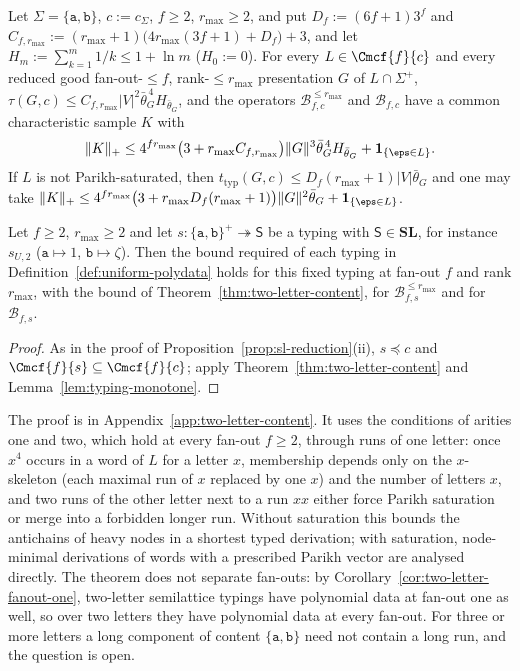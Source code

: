 \begin{theorem}
\label{thm:two-letter-content}
Let $\Sigma=\{\mathtt a,\mathtt b\}$, $c:=c_\Sigma$, $f\ge2$, $r_{\max}\ge2$, and put
$D_f:=(6f+1)3^f$ and
$C_{f,r_{\max}}:=(r_{\max}+1)\bigl(4r_{\max}(3f+1)+D_f\bigr)+3$, and let
$H_m:=\sum_{k=1}^m1/k\le1+\ln m$ \textup($H_0:=0$\textup).  For every
$L\in\Cmcf{f}{c}$ and every reduced good fan-out-$\le f$, rank-$\le r_{\max}$
presentation $G$ of $L\cap\Sigma^+$,
$\tau(G,c)\le C_{f,r_{\max}}|V|^2\bar\theta_G^{\,4}H_{\bar\theta_G}$, and the operators
$\mathcal B^{\le r_{\max}}_{f,c}$ and $\mathcal B_{f,c}$ have a common
characteristic sample $K$ with
\[
 \|K\|_+\le4^{fr_{\max}}\bigl(3+r_{\max}C_{f,r_{\max}}\bigr)\|G\|^3\bar\theta_G^{\,4}H_{\bar\theta_G}
 +\mathbf 1_{\{\eps\in L\}}.
\]
If $L$ is not Parikh-saturated, then
$t_{\mathrm{typ}}(G,c)\le D_f(r_{\max}+1)|V|\bar\theta_G$ and one may take
$\|K\|_+\le4^{fr_{\max}}\bigl(3+r_{\max}D_f(r_{\max}+1)\bigr)\|G\|^2\bar\theta_G
+\mathbf 1_{\{\eps\in L\}}$.
\end{theorem}

\begin{corollary}
\label{cor:two-letter-semilattice}
Let $f\ge2$, $r_{\max}\ge2$ and let $s:\{\mathtt a,\mathtt b\}^+\twoheadrightarrow\mathsf S$ be a
typing with $\mathsf S\in\mathbf{SL}$, for instance $s_{U,2}$
\textup($\mathtt a\mapsto1$, $\mathtt b\mapsto\zeta$\textup).  Then the bound
required of each typing in Definition~\ref{def:uniform-polydata} holds for this
fixed typing at fan-out $f$ and rank $r_{\max}$, with the bound of
Theorem~\ref{thm:two-letter-content}, for
$\mathcal B^{\le r_{\max}}_{f,s}$ and for $\mathcal B_{f,s}$.
\end{corollary}

\begin{proof}
As in the proof of Proposition~\ref{prop:sl-reduction}(ii), $s\preceq c$ and
$\Cmcf{f}{s}\subseteq\Cmcf{f}{c}$; apply Theorem~\ref{thm:two-letter-content} and
Lemma~\ref{lem:typing-monotone}.
\end{proof}

The proof is in Appendix~\ref{app:two-letter-content}.  It uses the
conditions of arities one and two, which hold at every fan-out $f\ge2$, through
runs of one letter: once $x^4$ occurs in a word of
$L$ for a letter $x$, membership depends only on the $x$-skeleton (each maximal
run of $x$ replaced by one $x$) and the number of letters $x$, and two runs of the other letter next to a run $xx$ either
force Parikh saturation or merge into a forbidden longer run.  Without
saturation this bounds the antichains of heavy nodes in a shortest typed
derivation; with saturation, node-minimal derivations of words with a
prescribed Parikh vector are analysed directly.  The theorem does not separate
fan-outs: by Corollary~\ref{cor:two-letter-fanout-one}, two-letter
semilattice typings have polynomial data at fan-out one as well, so over two
letters they have polynomial data at every fan-out.  For three or more
letters a long component of content $\{\mathtt a,\mathtt b\}$ need not contain a
long run, and the question is open.

